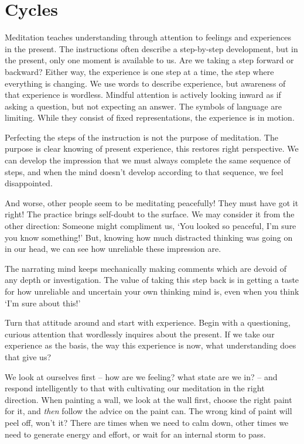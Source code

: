 \chapter{Cycles}


Meditation teaches understanding through attention to feelings and
experiences in the present. The instructions often describe a
step-by-step development, but in the present, only one moment is
available to us. Are we taking a step forward or backward? Either way,
the experience is one step at a time, the step where everything is
changing. We use words to describe experience, but awareness of that
experience is wordless. Mindful attention is actively looking inward as
if asking a question, but not expecting an answer. The symbols of
language are limiting. While they consist of fixed representations, the
experience is in motion.

Perfecting the steps of the instruction is not the purpose of
meditation. The purpose is clear knowing of present experience, this
restores right perspective. We can develop the impression that we must
always complete the same sequence of steps, and when the mind doesn't
develop according to that sequence, we feel disappointed.


And worse, other people seem to be meditating peacefully! They must have
got it right! The practice brings self-doubt to the surface. We may
consider it from the other direction: Someone might compliment us, `You
looked so peaceful, I'm sure you know something!' But, knowing how much
distracted thinking was going on in our head, we can see how unreliable
these impression are.

\clearpage

The narrating mind keeps mechanically making comments which are devoid
of any depth or investigation. The value of taking this step back is in
getting a taste for how unreliable and uncertain your own thinking mind
is, even when you think `I'm sure about this!'

Turn that attitude around and start with experience. Begin with a
questioning, curious attention that wordlessly inquires about the
present. If we take our experience as the basis, the way this experience
is now, what understanding does that give us?

We look at ourselves first -- how are we feeling? what state are we in?
-- and respond intelligently to that with cultivating our meditation in
the right direction. When painting a wall, we look at the wall first,
choose the right paint for it, and \emph{then} follow the advice on the
paint can. The wrong kind of paint will peel off, won't it? There are
times when we need to calm down, other times we need to generate energy
and effort, or wait for an internal storm to pass.

